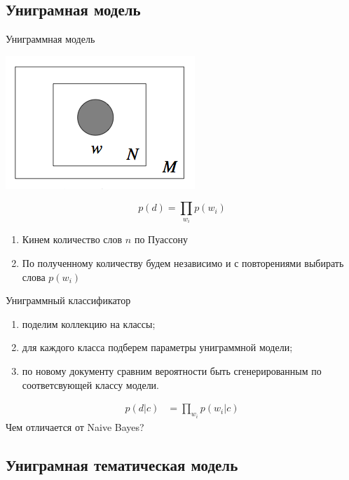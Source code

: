 \documentclass[14pt, fleqn, xcolor={dvipsnames, table}]{beamer}
\begin{document}
\subsection{Униграмная модель}

\begin{frame}{Униграммная модель}
\begin{center}
\includegraphics[height=0.3\textheight]{Unigram.png}
\end{center}
$$
p(d) = \prod_{w_i} p(w_i)
$$
\begin{enumerate}
  \item Кинем количество слов $n$ по Пуассону
  \item По полученному количеству будем независимо и с повторениями выбирать слова $p(w_i)$
\end{enumerate}
\end{frame}

\begin{frame}{Униграммный классификатор}
\begin{enumerate}
\footnotesize
  \item поделим коллекцию на классы;
  \item для каждого класса подберем параметры униграммной модели;
  \item по новому документу сравним вероятности быть сгенерированным по соответсвующей классу модели.
\end{enumerate}
$$\begin{array}{ll}
p(d|c) &= \prod_{w_i} p(w_i|c)
\end{array}$$
Чем отличается от Naive Bayes?
\end{frame}

\subsection{Униграмная тематическая модель}
\end{document}
